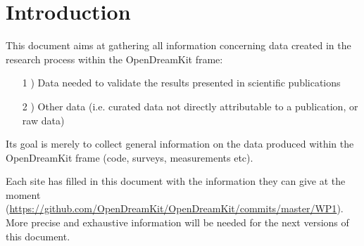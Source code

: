 \documentclass{deliverablereport}
\author{Benoît Pilorget}
\begin{document}
\maketitle
\newpage

\tableofcontents\newpage

\section{Introduction}

This document aims at gathering all information concerning data created in the research process within the OpenDreamKit frame:

\begin{enumerate}
\item[1]) Data needed to validate the results presented in scientific publications
\item[2]) Other data (i.e. curated data not directly attributable to a publication, or raw data)
\end{enumerate}
Its goal is merely to collect general information on the data produced within the OpenDreamKit frame (code, surveys, measurements etc). 

Each site has filled in this document with the information they can give at the moment (\href{https://github.com/OpenDreamKit/OpenDreamKit/commits/master/WP1}{https://github.com/OpenDreamKit/OpenDreamKit/commits/master/WP1}). More precise and exhaustive information will be needed for the next versions of this document.
\end{document}
